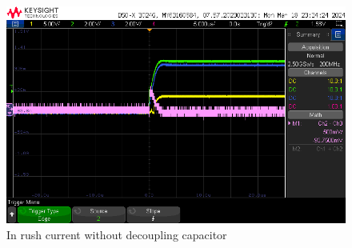 \documentclass[a4paper,11pt]{article}%
\begin{document}
\begin{enumerate}
\begin{itemize}
		            \begin{figure}[H]
			            \centering
			            \includegraphics[scale=0.6]{figures/inrush_without_cap.png}
			            \caption{In rush current without decoupling capacitor}
		            \end{figure}
	      \end{itemize}
\end{enumerate}
\end{document}
